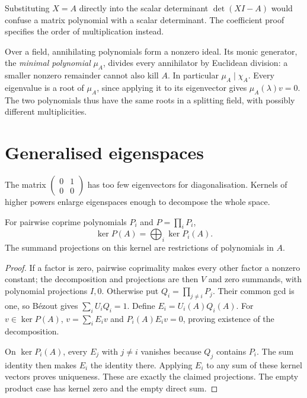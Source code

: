 Substituting $X=A$ directly into the scalar determinant $\det(XI-A)$ would confuse a matrix polynomial with a scalar determinant. The coefficient proof specifies the order of multiplication instead.

Over a field, annihilating polynomials form a nonzero ideal. Its monic generator, the \emph{minimal polynomial} $\mu_A$, divides every annihilator by Euclidean division: a smaller nonzero remainder cannot also kill $A$. In particular $\mu_A\mid\chi_A$. Every eigenvalue is a root of $\mu_A$, since applying it to its eigenvector gives $\mu_A(\lambda)v=0$. The two polynomials thus have the same roots in a splitting field, with possibly different multiplicities.

\section{Generalised eigenspaces}

The matrix $\begin{pmatrix}0&1\\0&0\end{pmatrix}$ has too few eigenvectors for diagonalisation. Kernels of higher powers enlarge eigenspaces enough to decompose the whole space.

\begin{lemma}\label{linear:lem:kernels}
For pairwise coprime polynomials $P_i$ and $P=\prod_iP_i$,
\[\ker P(A)=\bigoplus_i\ker P_i(A).\]
The summand projections on this kernel are restrictions of polynomials in $A$.
\end{lemma}
\begin{proof}
If a factor is zero, pairwise coprimality makes every other factor a nonzero constant; the decomposition and projections are then $V$ and zero summands, with polynomial projections $I,0$. Otherwise put $Q_i=\prod_{j\ne i}P_j$. Their common gcd is one, so B\'ezout gives $\sum_iU_iQ_i=1$. Define $E_i=U_i(A)Q_i(A)$. For $v\in\ker P(A)$, $v=\sum_iE_iv$ and $P_i(A)E_iv=0$, proving existence of the decomposition.

On $\ker P_i(A)$, every $E_j$ with $j\ne i$ vanishes because $Q_j$ contains $P_i$. The sum identity then makes $E_i$ the identity there. Applying $E_i$ to any sum of these kernel vectors proves uniqueness. These are exactly the claimed projections. The empty product case has kernel zero and the empty direct sum.
\end{proof}

